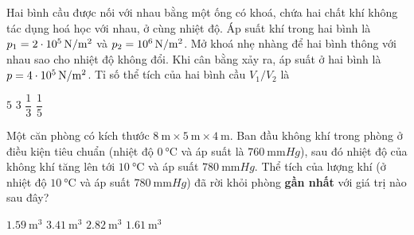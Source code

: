\begin{ex}
Hai bình cầu được nối với nhau bằng một ống có khoá, chứa hai chất khí không tác dụng hoá học với nhau, ở cùng nhiệt độ. Áp suất khí trong hai bình là $p_1=\SI{2E5}{\newton/\meter^2}$ và $p_2=\SI{E6}{\newton/\meter^2}$. Mở khoá nhẹ nhàng để hai bình thông với nhau sao cho nhiệt độ không đổi. Khi cân bằng xảy ra, áp suất ở hai bình là $p=\SI{4E5}{\newton/\meter^2}$. Tỉ số thể tích của hai bình cầu $V_1/V_2$ là
	
	\choice
	{$5$}
	{\True $3$}
	{$\dfrac{1}{3}$}
	{$\dfrac{1}{5}$}
\end{ex}
\begin{ex}
Một căn phòng có kích thước $\SI{8}{\meter}\times \SI{5}{\meter}\times\SI{4}{\meter}$. Ban đầu không khí trong phòng ở điều kiện tiêu chuẩn (nhiệt độ $\SI{0}{\celsius}$ và áp suất là $\SI{760}{\milli\meter Hg}$), sau đó nhiệt độ của không khí tăng lên tới $\SI{10}{\celsius}$ và áp suất $\SI{780}{\milli\meter Hg}$. Thể tích của lượng khí (ở nhiệt độ $\SI{10}{\celsius}$ và áp suất $\SI{780}{\milli\meter Hg}$) đã rời khỏi phòng \textbf{gần nhất} với giá trị nào sau đây?
	
	\choice
	{$\SI{1.59}{\meter^3}$}
	{$\SI{3.41}{\meter^3}$}
	{$\SI{2.82}{\meter^3}$}
	{\True $\SI{1.61}{\meter^3}$}
\end{ex}
